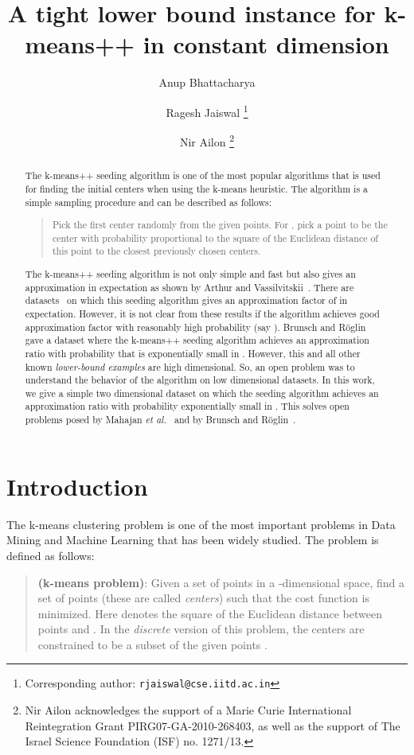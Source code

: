 \documentclass[11pt]{article}
\title{A tight lower bound instance for k-means++ in constant dimension}
\author[1]{Anup Bhattacharya}
\author[1]{Ragesh Jaiswal \thanks{Corresponding author: \texttt{rjaiswal@cse.iitd.ac.in}}}
\author[2]{Nir Ailon \thanks{Nir Ailon acknowledges the support of a Marie Curie International Reintegration Grant PIRG07-GA-2010-268403, as well as the support of The Israel Science Foundation (ISF) no. 1271/13.}}
\affil[1]{IIT Delhi, India}
\affil[2]{Technion, Haifa, Israel}
\date{}
\newcommand{\etal}{{\it et al.}}
\begin{document}
\maketitle
\begin{abstract}
The k-means++ seeding algorithm is one of the most popular algorithms that is used for finding the initial  centers when using the k-means heuristic. The algorithm is a simple sampling procedure and can be described as follows: 
\begin{quote}
Pick the first center randomly from the given points. 
For , pick a point to be the  center with probability proportional to the square of the Euclidean distance of this point to the closest previously  chosen centers.
\end{quote}
The k-means++ seeding algorithm is not only simple and fast but also gives an  approximation in expectation as shown by Arthur and Vassilvitskii~\cite{ArthurV07}.
There are datasets~\cite{ArthurV07,AggarwalDK09} on which this seeding algorithm gives an approximation factor of  in expectation. 
However, it is not clear from these results if the algorithm achieves good approximation factor with reasonably high probability (say ). 
Brunsch and R\"{o}glin~\cite{br12} gave a dataset where the k-means++ seeding algorithm achieves an   approximation ratio with probability that is exponentially small in . 
However, this and all other known {\em lower-bound examples} \cite{ArthurV07,AggarwalDK09} are high dimensional. 
So, an open problem was to understand the behavior of the algorithm on low dimensional datasets. 
In this work, we give a simple two dimensional dataset on which the seeding algorithm achieves an  approximation ratio with probability exponentially small in . 
This solves open problems posed by Mahajan \etal~\cite{mnv12} and by Brunsch and R\"{o}glin~\cite{br12}.
\end{abstract}



\section{Introduction}

The k-means clustering problem is one of the most important problems in Data Mining and Machine Learning that has been widely studied. The problem is defined as follows:
\begin{quote}
{\bf (k-means problem)}: Given a set of  points  in a -dimensional space, find a set of  points  (these are called {\em centers}) such that the cost function  is minimized. 
Here  denotes the square of the Euclidean distance between points  and .
In the {\em discrete} version of this problem, the centers are constrained to be a subset of the given points .
\end{quote}
\end{document}
